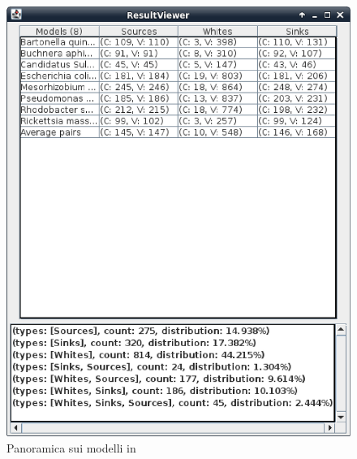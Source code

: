 \begin{figure}
  \centering
  \includegraphics[scale=.7]{images/ResultViewer-standard-models-overview}
  \caption{Panoramica sui modelli in \cite{SymBioCyc}}
  \label{fig:ResultViewer-standard-models-overview}
\end{figure}

